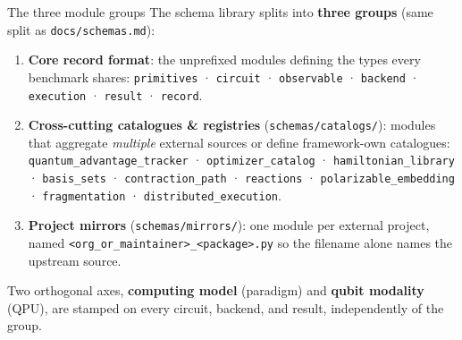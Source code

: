 \documentclass[
  ignorenonframetext,
  aspectratio=169,
]{beamer}
\providecommand{\tightlist}{%
  \setlength{\itemsep}{0pt}\setlength{\parskip}{0pt}}
\begin{document}
\begin{frame}[fragile]{The three module groups}
\label{the-three-module-groups}
The schema library splits into \textbf{three groups} (same split as
\texttt{docs/schemas.md}):

\begin{enumerate}
\tightlist
\item
  \textbf{Core record format}: the unprefixed modules defining the types
  every benchmark shares: \texttt{primitives} · \texttt{circuit} ·
  \texttt{observable} · \texttt{backend} · \texttt{execution} ·
  \texttt{result} · \texttt{record}.
\item
  \textbf{Cross-cutting catalogues \& registries}
  (\texttt{schemas/catalogs/}): modules that aggregate \emph{multiple}
  external sources or define framework-own catalogues:
  \texttt{quantum\_advantage\_tracker} · \texttt{optimizer\_catalog} ·
  \texttt{hamiltonian\_library} · \texttt{basis\_sets} ·
  \texttt{contraction\_path} · \texttt{reactions} ·
  \texttt{polarizable\_embedding} · \texttt{fragmentation} ·
  \texttt{distributed\_execution}.
\item
  \textbf{Project mirrors} (\texttt{schemas/mirrors/}): one module per
  external project, named
  \texttt{\textless{}org\_or\_maintainer\textgreater{}\_\textless{}package\textgreater{}.py}
  so the filename alone names the upstream source.
\end{enumerate}

\vspace{0.3em}

Two orthogonal axes, \textbf{computing model} (paradigm) and
\textbf{qubit modality} (QPU), are stamped on every circuit, backend,
and result, independently of the group.
\end{frame}
\end{document}

